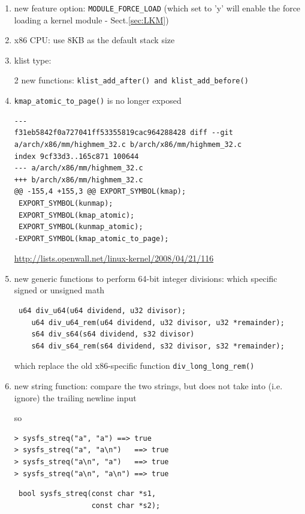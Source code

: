 \begin{enumerate}

  \item new feature option: \verb!MODULE_FORCE_LOAD! 
  (which set to 'y' will enable the force loading a kernel module -
  Sect.\ref{sec:LKM})
  
  \item x86 CPU: use 8KB as the default stack size
  
  \item klist type:
  
  2 new functions: \verb!klist_add_after() and klist_add_before()!
  
  
  \item \verb!kmap_atomic_to_page()! is no longer exposed

\begin{verbatim}
---
f31eb5842f0a727041ff53355819cac964288428 diff --git a/arch/x86/mm/highmem_32.c b/arch/x86/mm/highmem_32.c
index 9cf33d3..165c871 100644
--- a/arch/x86/mm/highmem_32.c
+++ b/arch/x86/mm/highmem_32.c
@@ -155,4 +155,3 @@ EXPORT_SYMBOL(kmap);
 EXPORT_SYMBOL(kunmap);
 EXPORT_SYMBOL(kmap_atomic);
 EXPORT_SYMBOL(kunmap_atomic);
-EXPORT_SYMBOL(kmap_atomic_to_page);
\end{verbatim} 
\url{http://lists.openwall.net/linux-kernel/2008/04/21/116}

  \item new generic functions to perform 64-bit integer divisions: which
  specific signed or unsigned  math
  
\begin{verbatim}
 u64 div_u64(u64 dividend, u32 divisor);
    u64 div_u64_rem(u64 dividend, u32 divisor, u32 *remainder);
    s64 div_s64(s64 dividend, s32 divisor)
    s64 div_s64_rem(s64 dividend, s32 divisor, s32 *remainder);
\end{verbatim} 

which replace the old x86-specific function \verb!div_long_long_rem()!

   \item new string function: compare the two strings, but does not take into
   (i.e. ignore) the trailing newline input 

so 
\begin{verbatim}
> sysfs_streq("a", "a")	==> true
> sysfs_streq("a", "a\n")	==> true
> sysfs_streq("a\n", "a")	==> true
> sysfs_streq("a\n", "a\n") ==> true
\end{verbatim}

\begin{verbatim}
 bool sysfs_streq(const char *s1, 
                  const char *s2);
\end{verbatim}


\end{enumerate}
